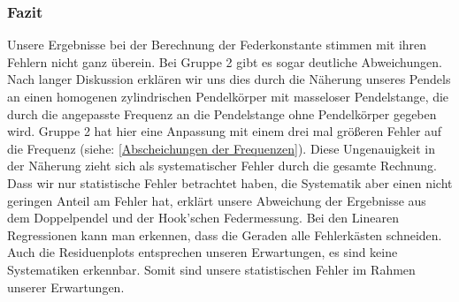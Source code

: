 \documentclass[12pt,a4paper]{article}
\begin{document}
\subsubsection{Fazit}
Unsere Ergebnisse bei der Berechnung der Federkonstante stimmen mit ihren Fehlern nicht ganz überein. Bei Gruppe 2 gibt es sogar deutliche Abweichungen. Nach langer Diskussion erklären wir uns dies durch die Näherung unseres Pendels an einen homogenen zylindrischen Pendelkörper mit masseloser Pendelstange, die durch die angepasste Frequenz an die Pendelstange ohne Pendelkörper gegeben wird. Gruppe 2 hat hier eine Anpassung mit einem drei mal größeren Fehler auf die Frequenz (siehe: \ref{Abscheichungen der Frequenzen}). Diese Ungenauigkeit in der Näherung zieht sich als systematischer Fehler durch die gesamte Rechnung. Dass wir nur statistische Fehler betrachtet haben, die Systematik aber einen nicht geringen Anteil am Fehler hat, erklärt unsere Abweichung der Ergebnisse aus dem Doppelpendel und der Hook'schen Federmessung.
\newline
Bei den Linearen Regressionen kann man erkennen, dass die Geraden alle Fehlerkästen schneiden.
Auch die Residuenplots entsprechen unseren Erwartungen, es sind keine Systematiken erkennbar. Somit sind unsere statistischen Fehler im Rahmen unserer Erwartungen.
\end{document}
